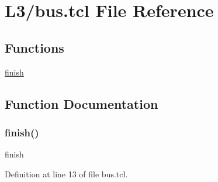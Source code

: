 \hypertarget{bus_8tcl}{}\section{L3/bus.tcl File Reference}
\label{bus_8tcl}
\subsection*{Functions}
\begin{DoxyCompactItemize}
\item 
\hyperlink{bus_8tcl_a30728837c246b65ef76298af0101d99c}{finish}
\end{DoxyCompactItemize}


\subsection{Function Documentation}
\mbox{\label{bus_8tcl_a30728837c246b65ef76298af0101d99c}} 
\subsubsection{\texorpdfstring{finish()}{finish()}}
{\footnotesize\ttfamily finish}



Definition at line 13 of file bus.\+tcl.

